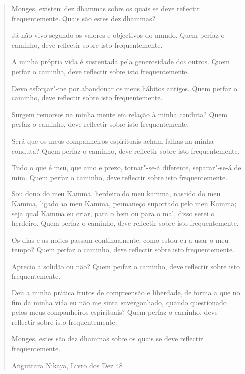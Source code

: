 \begin{verse}

Monges, existem dez dhammas sobre os quais se deve reflectir
frequentemente. Quais são estes dez dhammas?

Já não vivo segundo os valores e objectivos do mundo. 
Quem perfaz o caminho, deve reflectir sobre isto frequentemente.

A minha própria vida é sustentada pela generosidade dos outros. 
Quem perfaz o caminho, deve reflectir sobre isto frequentemente.

Devo esforçar"-me por abandonar os meus hábitos antigos. 
Quem perfaz o caminho, deve reflectir sobre isto frequentemente.

Surgem remorsos na minha mente em relação à minha conduta? 
Quem perfaz o caminho, deve reflectir sobre isto frequentemente.

Será que os meus companheiros espirituais acham falhas na minha conduta?
Quem perfaz o caminho, deve reflectir sobre isto frequentemente.

Tudo o que é meu, que amo e prezo, tornar"-se-á diferente,
separar"-se-á de mim. 
Quem perfaz o caminho, deve reflectir sobre isto frequentemente.

Sou dono do meu Kamma, herdeiro do meu kamma, nascido do meu
Kamma, ligado ao meu Kamma, permaneço suportado pelo meu Kamma;
seja qual Kamma eu criar, para o bem ou para o mal, disso serei o herdeiro. 
Quem perfaz o caminho, deve reflectir sobre isto frequentemente.

\enlargethispage{\baselineskip}

Os dias e as noites passam continuamente; como estou eu a usar o meu tempo? 
Quem perfaz o caminho, deve reflectir sobre isto frequentemente.

Aprecio a solidão ou não? 
Quem perfaz o caminho, deve reflectir sobre isto frequentemente.

Deu a minha prática frutos de compreensão e liberdade,
de forma a que no fim da minha vida eu não me sinta envergonhado, quando
questionado pelos meus companheiros espirituais? 
Quem perfaz o caminho, deve reflectir sobre isto frequentemente.

Monges, estes são dez dhammas sobre os quais se deve reflectir frequentemente.

{\raggedleft
Aṅguttara Nikāya, Livro dos Dez 48
\par}

\end{verse}

